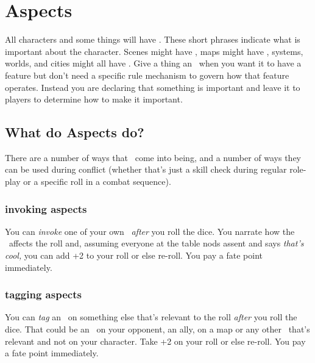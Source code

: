 \section{Aspects}\label{sec:aspects}  %



All characters and some things will have \Aspects. These short phrases indicate 
what is important about the character. Scenes might have \Aspects, maps might 
have \Aspects, systems, worlds, and cities might all have \Aspects. Give a 
thing an \Aspect\ when you want it to have a feature but don't need a specific 
rule mechanism to govern how that feature operates. Instead you are declaring 
that something is important and leave it to players to determine how to make 
it important.

\subsection{What do Aspects do?}\label{sec:what-do-aspects-do} %

There are a number of ways that \Aspects\ come into being, and a number of 
ways they can be used during conflict (whether that's just a skill check 
during regular role-play or a specific roll in a combat sequence).


\subsubsection{invoking aspects}

You can \emph{invoke} one of your own \Aspects\ 
\emph{after} you roll the dice. You narrate how the \Aspect\ affects the roll 
and, assuming everyone at the table nods assent and says \emph{that's cool,} 
you can add +2 to your roll or else re-roll. You pay a fate point immediately.

\subsubsection{tagging aspects}



You can \emph{tag} an \Aspect\ on something else that's 
relevant to the roll \emph{after} you roll the dice. That could be an \Aspect\ 
on your opponent, an ally, on a map  or any other \Aspect\ that's relevant and 
not on your character. Take +2 on your roll or else re-roll. You pay a fate 
point immediately.

